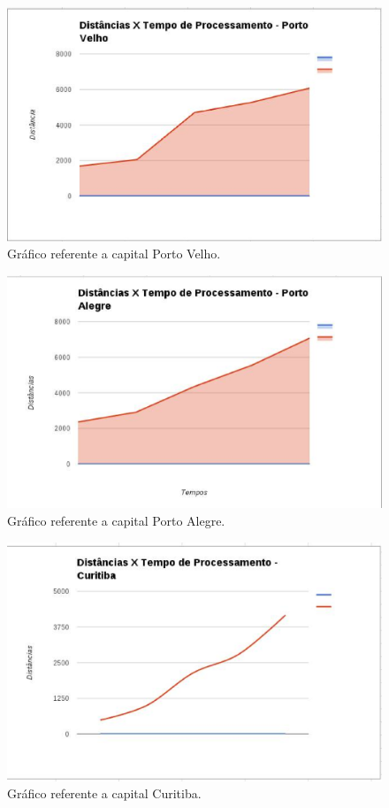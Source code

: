 \begin{figure}[!htb]
 \centering
 \includegraphics[scale= 0.5]{figuras/imagem1.eps}
 \caption{Gráfico referente a capital Porto Velho.}
\end{figure}

\begin{figure}[!htb]
 \centering
 \includegraphics[scale= 0.5]{figuras/imagem2.eps}
 \caption{Gráfico referente a capital Porto Alegre.}
\end{figure}

\begin{figure}[!htb]
 \centering
 \includegraphics[scale= 0.5]{figuras/imagem3.eps}
 \caption{Gráfico referente a capital Curitiba.}
\end{figure}

